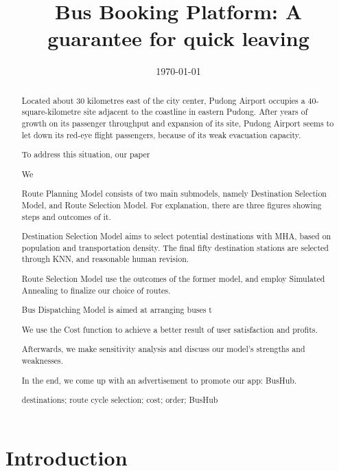 \documentclass{mcmthesis}
\begin{document}
\linespread{0.6} %
\setlength{\parskip}{0.5\baselineskip} %
\title{Bus Booking Platform: A guarantee for quick leaving}

\date{\today}
	\begin{abstract}
	
     Located about 30 kilometres east of the city center, Pudong Airport
     occupies a 40-square-kilometre  site adjacent to the coastline
     in eastern Pudong. After years of growth on its passenger throughput and expansion of its site, Pudong Airport seems to let down its red-eye flight passengers, because of its weak evacuation capacity.
     
     To address this situation, our paper 
     
     We 
     
     Route Planning Model consists of two main submodels, namely Destination Selection Model, and Route Selection Model. For explanation, there are three figures showing steps and outcomes of it.
     
     Destination Selection Model aims to select potential destinations with MHA, based on population and transportation density. The final fifty destination stations are selected through KNN, and reasonable human revision.
     
     Route Selection Model use the outcomes of the former model, and employ Simulated Annealing to finalize our choice of routes.
     
     Bus Dispatching Model is aimed at arranging buses t
     
	 We use the Cost function to achieve a better result of user satisfaction and profits.
	
	 Afterwards, we make sensitivity analysis and discuss our model's strengths and weaknesses.
	 
	 In the end, we come up with an advertisement to promote our app: BusHub.
	
		\begin{keywords}
		destinations; route cycle selection; cost; order; BusHub
		\end{keywords}
	\end{abstract}

\maketitle

\tableofcontents

\newpage

\section{Introduction}
\end{document}
